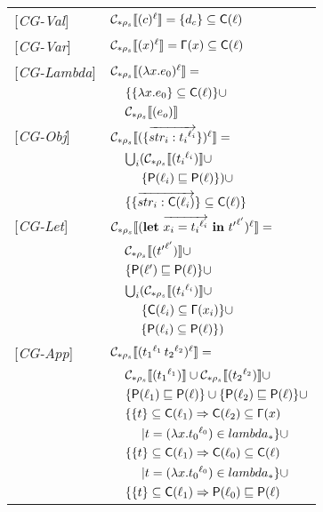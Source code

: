 \documentclass[[12pt,a4paper,twoside,openrigh]{article}
\newcommand{\lbt}[1]{{t_#1}^{\ell_#1}}
\newcommand{\letexprs}[3]{\mathbf{let}\ \vec{#1 = #2}\ \mathbf{in}\ #3}
\begin{document}
\begin{tabular}{l l l l}
{[\textit{CG-Val}]} & \multicolumn{3}{l}{$ \mathcal{C}_{*\rho_s}\llbracket (c)^\ell \rrbracket = \{d_c\} \subseteq \mathsf{C}(\ell)$} \\ 
{[\textit{CG-Var}]} & \multicolumn{3}{l}{$ \mathcal{C}_{*\rho_s}\llbracket (x)^\ell \rrbracket = \mathsf{\Gamma}(x) \subseteq \mathsf{C}(\ell)$} \\ 
{[\textit{CG-Lambda}]} & \multicolumn{3}{l}{$ \mathcal{C}_{*\rho_s}\llbracket (\lambda x.e_0)^\ell \rrbracket = $}\\
&& \multicolumn{2}{l}{$\{\{\lambda x.e_0\} \subseteq \mathsf{C}(\ell)\}\cup $}\\
&& \multicolumn{2}{l}{$ \mathcal{C}_{*\rho_s}\llbracket (e_o) \rrbracket $} \\
{[\textit{CG-Obj}]} & \multicolumn{3}{l}{$ \genl {\rec{\vec{str_i : \lbt i}}} = $}\\
&& \multicolumn{2}{l}{$\bigcup_i (\gen {\lbt i} \cup$}\\
&&& $\{\mathsf{P}(\ell_i) \sqsubseteq \mathsf{P}(\ell)\})\cup$\\ 
&& \multicolumn{2}{l}{$\{ \{\overrightarrow{str_i : \mathsf{C}(\ell_i)}\} \subseteq \mathsf{C}(\ell) \} $} \\
{[\textit{CG-Let}]} & \multicolumn{3}{l}{$\genl {\letexprs{x_i}{\lbt i}{{t'}^{\ell'}}} = $}\\
&& \multicolumn{2}{l}{$ \mathcal{C}_{*\rho_s}\llbracket ({t'}^{\ell'}) \rrbracket \cup$} \\
&& \multicolumn{2}{l}{$ \{\mathsf{P}(\ell') \sqsubseteq \mathsf{P}(\ell)\} \cup$}\\
&& \multicolumn{2}{l}{$ \bigcup_i (\gen {\lbt i} \cup$ }\\
&&& $ \{\mathsf{C}(\ell_i) \subseteq \mathsf{\Gamma}(x_i)\} \cup$ \\
&&& $ \{ \mathsf{P}(\ell_i) \subseteq \mathsf{P}(\ell) \}) $ \\
{[\textit{CG-App}]}&\multicolumn{3}{l}{$ \genl {\appl {\lbt 1} {\lbt 2}} = $}\\
&& \multicolumn{2}{l}{$\gen {\lbt 1} \cup \gen {\lbt 2} \cup$} \\
&& \multicolumn{2}{l}{$\{ \mathsf{P}(\ell_1) \sqsubseteq \mathsf{P}(\ell) \} \cup \{ \mathsf{P}(\ell_2) \sqsubseteq \mathsf{P}(\ell) \}\cup$} \\
&& \multicolumn{2}{l}{$\{\{ t \} \subseteq \mathsf{C}(\ell_1) \Rightarrow \mathsf{C}(\ell_2) \subseteq \mathsf{\Gamma}(x)$}\\
&&&$| t = (\lam {x} {\lbt 0}) \in lambda_* \}\cup$\\
&& \multicolumn{2}{l}{$\{\{ t \} \subseteq \mathsf{C}(\ell_1) \Rightarrow \mathsf{C}(\ell_0) \subseteq \mathsf{C}(\ell)$}\\
&&&$| t = (\lam {x} {\lbt 0}) \in lambda_* \}\cup$\\
&& \multicolumn{2}{l}{$\{\{ t \} \subseteq \mathsf{C}(\ell_1) \Rightarrow \mathsf{P}(\ell_0) \sqsubseteq \mathsf{P}(\ell)$}\\

\end{tabular}
\end{document}
